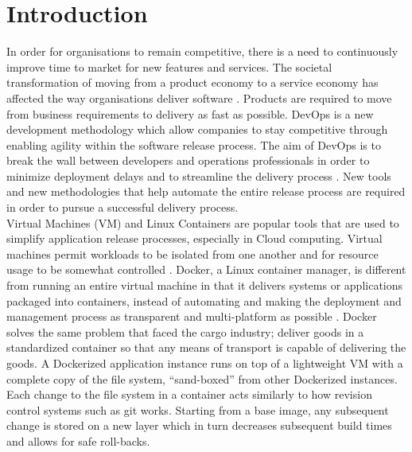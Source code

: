 \chapter{Introduction}


In order for organisations to remain competitive, there is a need to continuously improve time to market for new features and services. The societal transformation of moving from a product economy to a service economy has affected the way organisations deliver software \cite{mckinsey}. Products are required to move from business requirements to delivery as fast as possible. DevOps is a new development methodology which allow companies to stay competitive through enabling agility within the software release process. The aim of DevOps is to break the wall between developers and operations professionals in order to minimize deployment delays and to streamline the delivery process \cite{Httermann:2012:DD:2380958}. New tools and new methodologies that help automate the entire release process are required in order to pursue a successful delivery process.\\

Virtual Machines (VM) and Linux Containers are popular tools that are used to simplify application release processes, especially in Cloud computing. Virtual machines permit workloads to be isolated from one another and for resource usage to be somewhat controlled \cite{p6}. Docker, a Linux container manager, is different from running an entire virtual machine in that it delivers systems or applications packaged into containers, instead of automating and making the deployment and management process as transparent and multi-platform as possible \cite{p6}. Docker solves the same problem that faced the cargo industry; deliver goods in a standardized container so that any means of transport is capable of delivering the goods. A Dockerized application instance runs on top of a lightweight VM with a complete copy of the file system, “sand-boxed” from other Dockerized instances. Each change to the file system in a container acts similarly to how revision control systems such as git works. Starting from a base image, any subsequent change is stored on a new layer which in turn decreases subsequent build times and allows for safe roll-backs.\\

